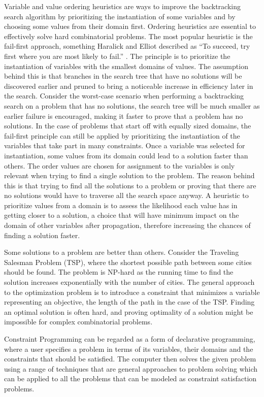 \documentclass{l4proj}
\begin{document}
\noindent Variable and value ordering heuristics are ways to improve the backtracking search algorithm by prioritizing the instantiation of some variables and by choosing some values from their domain first. Ordering heuristics are essential to effectively solve hard combinatorial problems. The most popular heuristic is the fail-first approach, something Haralick and Elliot described as “To succeed, try first where you are most likely to fail.” \cite{haralick1980increasing}. The principle is to prioritize the instantiation of variables with the smallest domains of values. The assumption behind this is that branches in the search tree that have no solutions will be discovered earlier and pruned to bring a noticeable increase in efficiency later in the search. Consider the worst-case scenario when performing a backtracking search on a problem that has no solutions, the search tree will be much smaller as earlier failure is encouraged, making it faster to prove that a problem has no solutions. In the case of problems that start off with equally sized domains, the fail-first principle can still be applied by prioritizing the instantiation of the variables that take part in many constraints. Once a variable was selected for instantiation, some values from its domain could lead to a solution faster than others. The order values are chosen for assignment to the variables is only relevant when trying to find a single solution to the problem. The reason behind this is that trying to find all the solutions to a problem or proving that there are no solutions would have to traverse all the search space anyway. A heuristic to prioritize values from a domain is to assess the likelihood each value has in getting closer to a solution, a choice that will have minimum impact on the domain of other variables after propagation, therefore increasing the chances of finding a solution faster. 

\noindent Some solutions to a problem are better than others. Consider the Traveling Salesman Problem (TSP), where the shortest possible path between some cities should be found. The problem is NP-hard as the running time to find the solution increases exponentially with the number of cities. The general approach to the optimization problem is to introduce a constraint that minimizes a variable representing an objective, the length of the path in the case of the TSP. Finding an optimal solution is often hard, and proving optimality of a solution might be impossible for complex combinatorial problems.

\noindent Constraint Programming can be regarded as a form of declarative programming, where a user specifies a problem in terms of its variables, their domains and the constraints that should be satisfied. The computer then solves the given problem using a range of techniques that are general approaches to problem solving which can be applied to all the problems that can be modeled as constraint satisfaction problems.
\end{document}
